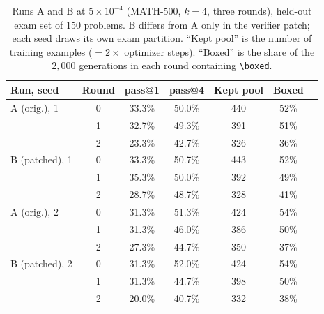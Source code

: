 \documentclass[runningheads]{llncs}
\begin{document}
\begin{table}[t]
\caption{Runs A and B at $5\times10^{-4}$ (MATH-500, $k=4$, three rounds),
held-out exam set of 150 problems. B differs from A only in the verifier patch;
each seed draws its own exam partition. ``Kept pool'' is the number of
training examples ($=2\times$ optimizer steps). ``Boxed'' is the share of the
$2{,}000$ generations in each round containing \texttt{\textbackslash boxed}.}
\label{tab:lrcheck}
\centering
\setlength{\tabcolsep}{6pt}
\begin{tabular}{lcccccc}
\toprule
Run, seed & Round & pass@1 & pass@4 & Kept pool & Boxed \\
\midrule
A (orig.), 1   & 0 & 33.3\% & 50.0\% & 440 & 52\% \\
               & 1 & 32.7\% & 49.3\% & 391 & 51\% \\
               & 2 & 23.3\% & 42.7\% & 326 & 36\% \\
B (patched), 1 & 0 & 33.3\% & 50.7\% & 443 & 52\% \\
               & 1 & 35.3\% & 50.0\% & 392 & 49\% \\
               & 2 & 28.7\% & 48.7\% & 328 & 41\% \\
\midrule
A (orig.), 2   & 0 & 31.3\% & 51.3\% & 424 & 54\% \\
               & 1 & 31.3\% & 46.0\% & 386 & 50\% \\
               & 2 & 27.3\% & 44.7\% & 350 & 37\% \\
B (patched), 2 & 0 & 31.3\% & 52.0\% & 424 & 54\% \\
               & 1 & 31.3\% & 44.7\% & 398 & 50\% \\
               & 2 & 20.0\% & 40.7\% & 332 & 38\% \\
\bottomrule
\end{tabular}
\end{table}
\end{document}
